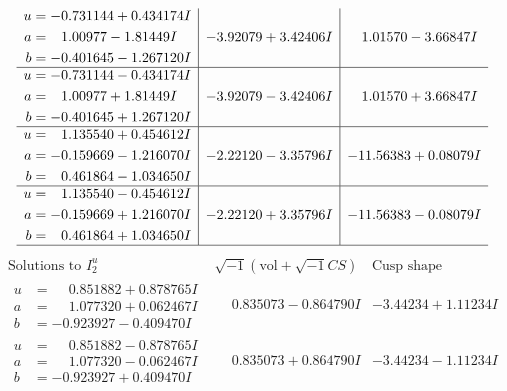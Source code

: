 \documentclass[1p]{elsarticle_modified}
\theoremstyle{definition}
\newcommand{\I}{\sqrt{-1}}
\begin{document}
$$\begin{array}{c|c|c}
\begin{aligned}
u &= -0.731144 + 0.434174 I \\
a &= \phantom{-}1.00977 - 1.81449 I \\
b &= -0.401645 - 1.267120 I\end{aligned}
 & -3.92079 + 3.42406 I & \phantom{-}1.01570 - 3.66847 I \\ \hline\begin{aligned}
u &= -0.731144 - 0.434174 I \\
a &= \phantom{-}1.00977 + 1.81449 I \\
b &= -0.401645 + 1.267120 I\end{aligned}
 & -3.92079 - 3.42406 I & \phantom{-}1.01570 + 3.66847 I \\ \hline\begin{aligned}
u &= \phantom{-}1.135540 + 0.454612 I \\
a &= -0.159669 - 1.216070 I \\
b &= \phantom{-}0.461864 - 1.034650 I\end{aligned}
 & -2.22120 - 3.35796 I & -11.56383 + 0.08079 I \\ \hline\begin{aligned}
u &= \phantom{-}1.135540 - 0.454612 I \\
a &= -0.159669 + 1.216070 I \\
b &= \phantom{-}0.461864 + 1.034650 I\end{aligned}
 & -2.22120 + 3.35796 I & -11.56383 - 0.08079 I\\
 \hline 
 \end{array}$$\newpage$$\begin{array}{c|c|c}  
\text{Solutions to }I^u_{2}& \I (\text{vol} + \sqrt{-1}CS) & \text{Cusp shape}\\
 \hline 
\begin{aligned}
u &= \phantom{-}0.851882 + 0.878765 I \\
a &= \phantom{-}1.077320 + 0.062467 I \\
b &= -0.923927 - 0.409470 I\end{aligned}
 & \phantom{-}0.835073 - 0.864790 I & -3.44234 + 1.11234 I \\ \hline\begin{aligned}
u &= \phantom{-}0.851882 - 0.878765 I \\
a &= \phantom{-}1.077320 - 0.062467 I \\
b &= -0.923927 + 0.409470 I\end{aligned}
 & \phantom{-}0.835073 + 0.864790 I & -3.44234 - 1.11234 I \\ \hline\begin{aligned}

\end{aligned}
\end{array}$$
\end{document}
